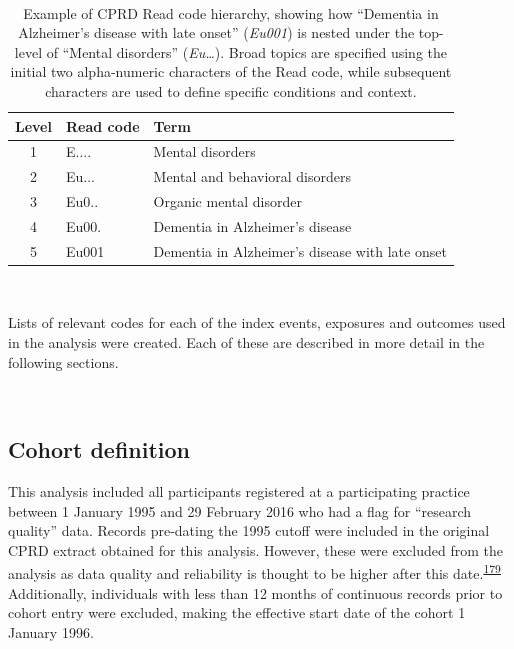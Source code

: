 \documentclass[a4paper, twoside]{templates/ociamthesis}
\begin{document}
~





\begin{table}[H]

\caption[Example of CPRD Read code hierarchy]{\label{tab:readExample-table}Example of CPRD Read code hierarchy, showing how ``Dementia in Alzheimer's disease with late onset'' (\emph{Eu001}) is nested under the top-level of ``Mental disorders'' (\emph{Eu\ldots{}}). Broad topics are specified using the initial two alpha-numeric characters of the Read code, while subsequent characters are used to define specific conditions and context.}
\centering
\begin{tabular}[t]{cll}
\toprule
\textbf{Level} & \textbf{Read code} & \textbf{Term}\\
\midrule
1 & E.... & Mental disorders\\
2 & Eu... & Mental and behavioral disorders\\
3 & Eu0.. & Organic mental disorder\\
4 & Eu00. & Dementia in Alzheimer's disease\\
5 & Eu001 & Dementia in Alzheimer's disease with late onset\\
\bottomrule
\end{tabular}
\end{table}

~

Lists of relevant codes for each of the index events, exposures and outcomes used in the analysis were created. Each of these are described in more detail in the following sections.

~

\hypertarget{cohort-definition}{%
\subsection{Cohort definition}\label{cohort-definition}}

This analysis included all participants registered at a participating practice between 1 January 1995 and 29 February 2016 who had a flag for ``research quality'' data. Records pre-dating the 1995 cutoff were included in the original CPRD extract obtained for this analysis. However, these were excluded from the analysis as data quality and reliability is thought to be higher after this date.\textsuperscript{\protect\hyperlink{ref-wolf2019}{179}} Additionally, individuals with less than 12 months of continuous records prior to cohort entry were excluded, making the effective start date of the cohort 1 January 1996.
\end{document}
